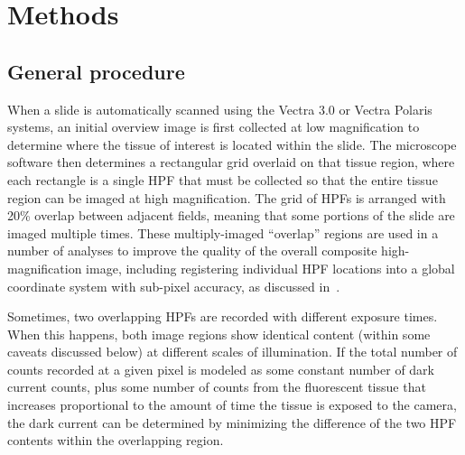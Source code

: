 \documentclass[letterpaper,11pt]{article}
\begin{document}
\section{Methods}
\label{sec:methods}

\subsection{General procedure}
\label{ssec:general_procedure}

When a slide is automatically scanned using the Vectra 3.0 or Vectra Polaris systems, an initial overview image is first collected at low magnification to determine where the tissue of interest is located within the slide. The microscope software then determines a rectangular grid overlaid on that tissue region, where each rectangle is a single HPF that must be collected so that the entire tissue region can be imaged at high magnification. The grid of HPFs is arranged with 20\% overlap between adjacent fields, meaning that some portions of the slide are imaged multiple times. These multiply-imaged ``overlap'' regions are used in a number of analyses to improve the quality of the overall composite high-magnification image, including registering individual HPF locations into a global coordinate system with sub-pixel accuracy, as discussed in~\cite{Heshy}.

Sometimes, two overlapping HPFs are recorded with different exposure times. When this happens, both image regions show identical content (within some caveats discussed below) at different scales of illumination. If the total number of counts recorded at a given pixel is modeled as some constant number of dark current counts, plus some number of counts from the fluorescent tissue that increases proportional to the amount of time the tissue is exposed to the camera, the dark current can be determined by minimizing the difference of the two HPF contents within the overlapping region.
\end{document}
